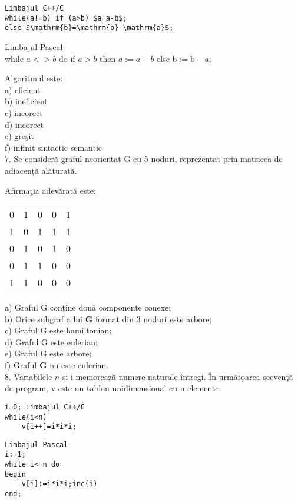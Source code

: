 \begin{verbatim}
Limbajul C++/C
while(a!=b) if (a>b) $a=a-b$;
else $\mathrm{b}=\mathrm{b}-\mathrm{a}$;
\end{verbatim}

Limbajul Pascal\\
while $a<>b$ do if $a>b$ then $a:=a-b$ else $\mathrm{b}:=\mathrm{b}-\mathrm{a}$;

Algoritmul este:\\
a) eficient\\
b) ineficient\\
c) incorect\\
d) incorect\\
e) greşit\\
f) infinit sintactic semantic\\
7. Se consideră graful neorientat G cu 5 noduri, reprezentat prin matricea de adiacență alăturată.

Afirmaţia adevărată este:

\begin{center}
\begin{tabular}{lllll}
0 & 1 & 0 & 0 & 1 \\
1 & 0 & 1 & 1 & 1 \\
0 & 1 & 0 & 1 & 0 \\
0 & 1 & 1 & 0 & 0 \\
1 & 1 & 0 & 0 & 0 \\
\end{tabular}
\end{center}

a) Graful G conține două componente conexe;\\
b) Orice subgraf a lui $\mathbf{G}$ format din 3 noduri este arbore;\\
c) Graful G este hamiltonian;\\
d) Graful G este eulerian;\\
e) Graful G este arbore;\\
f) Graful $\mathbf{G}$ nu este eulerian.\\
8. Variabilele $n$ și i memorează numere naturale întregi. În următoarea secvenţă de program, v este un tablou unidimensional cu n elemente:

\begin{verbatim}
i=0; Limbajul C++/C
while(i<n)
    v[i++]=i*i*i;
\end{verbatim}

\begin{verbatim}
Limbajul Pascal
i:=1;
while i<=n do
begin
    v[i]:=i*i*i;inc(i)
end;
\end{verbatim}


